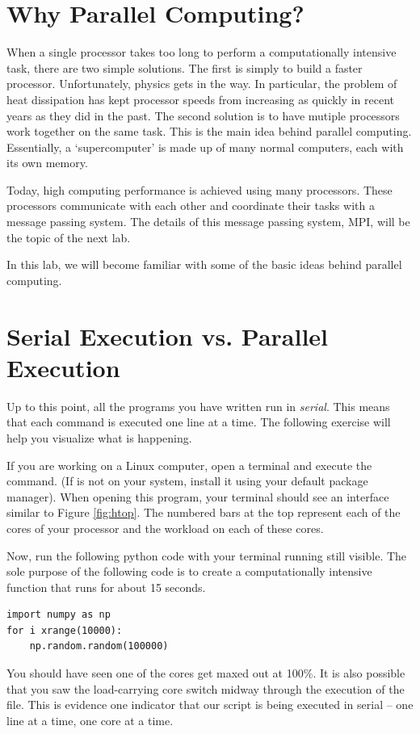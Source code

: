 \label{lab:parallel1}

\section*{Why Parallel Computing?}
When a single processor takes too long to perform a computationally intensive task, there are two simple solutions.
The first is simply to build a faster processor.
Unfortunately, physics gets in the way.
In particular, the problem of heat dissipation has kept processor speeds from increasing as quickly in recent years as they did in the past.
The second solution is to have mutiple processors work together on the same task.
This is the main idea behind parallel computing. Essentially, a `supercomputer' is made up of many normal computers, each with its own memory.

Today, high computing performance is achieved using many processors.
These processors communicate with each other and coordinate their tasks with a message passing system. The details of this message passing system, MPI, will be the topic of the next lab.

In this lab, we will become familiar with some of the basic ideas behind parallel computing.

\section*{Serial Execution vs. Parallel Execution}
Up to this point, all the programs you have written run in \emph{serial}. This means that each command is executed one line at a time. The following exercise will help you visualize what is happening.

\begin{problem}
If you are working on a Linux computer, open a terminal and execute the  command. (If  is not on your system, install it using your default package manager). When opening this program, your terminal should see an interface similar to Figure \ref{fig:htop}. The numbered bars at the top represent each of the cores of your processor and the workload on each of these cores.

Now, run the following python code with your terminal running  still visible. The sole purpose of the following code is to create a computationally intensive function that runs for about 15 seconds.

\begin{lstlisting}
import numpy as np
for i xrange(10000):
    np.random.random(100000)
\end{lstlisting}

You should have seen one of the cores get maxed out at 100\%. It is also possible that you saw the load-carrying core switch midway through the execution of the file. This is evidence one indicator that our script is being executed in serial -- one line at a time, one core at a time.
\end{problem}

